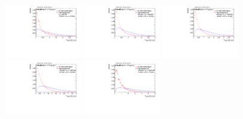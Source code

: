 \begin{figure}[H]
\bigskip
\includegraphics[width=0.3\textwidth]{sascha_input/Appendix/Distributions/higgs/distributions/beta2/h_normal_tj_D2_2_bin1.pdf} \hspace{1mm}
\includegraphics[width=0.3\textwidth]{sascha_input/Appendix/Distributions/higgs/distributions/beta2/h_normal_tj_D2_2_bin2.pdf} \hspace{4mm}
\includegraphics[width=0.3\textwidth]{sascha_input/Appendix/Distributions/higgs/distributions/beta2/h_normal_tj_D2_2_bin3.pdf} 
\bigskip
\includegraphics[width=0.3\textwidth]{sascha_input/Appendix/Distributions/higgs/distributions/beta2/h_normal_tj_D2_2_bin4.pdf} \hspace{4mm}
\includegraphics[width=0.3\textwidth]{sascha_input/Appendix/Distributions/higgs/distributions/beta2/h_normal_tj_D2_2_bin5.pdf} 


\end{figure}

